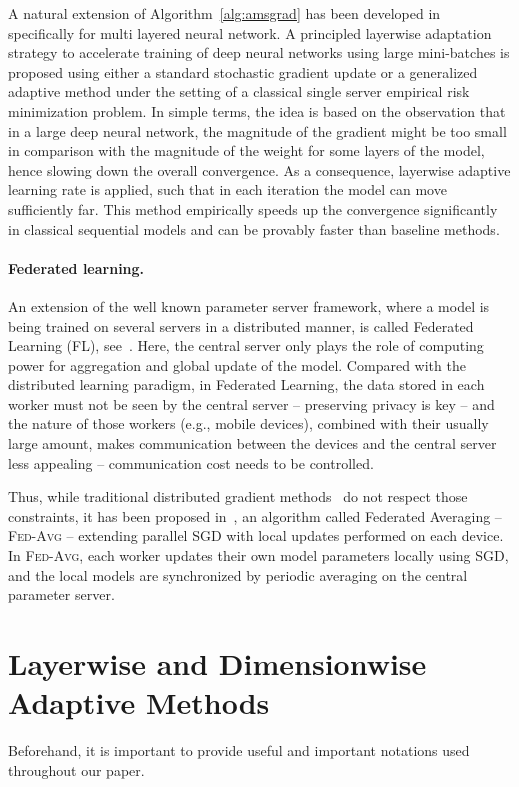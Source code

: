 \documentclass{article}
\begin{document}
A natural extension of Algorithm~\ref{alg:amsgrad} has been developed in~\citet{you2019large} specifically for multi layered neural network. 
A principled layerwise adaptation strategy to accelerate training of deep neural networks using large mini-batches is proposed using either a standard stochastic gradient update or a generalized adaptive method under the setting of a classical single server empirical risk minimization problem. 
 In simple terms, the idea is based on the observation that in a large deep neural network, the magnitude of the gradient might be too small in comparison with the magnitude of the weight for some layers of the model, hence slowing down the overall convergence. 
As a consequence, layerwise adaptive learning rate is applied, such that in each iteration the model can move sufficiently far. 
This method empirically speeds up the convergence significantly in classical sequential models and can be provably faster than baseline methods.


\medskip
\paragraph{Federated learning.}
An extension of the well known parameter server framework, where a model is being trained on several servers in a distributed manner, is called Federated Learning (FL), see~\citet{konevcny2016federated}.
Here, the central server only plays the role of computing power for aggregation and global update of the model.
Compared with the distributed learning paradigm, in Federated Learning, the data stored in each worker must not be seen by the central server -- preserving privacy is key -- and the nature of those workers (e.g., mobile devices), combined with their usually large amount, makes communication between the devices and the central server less appealing -- communication cost needs to be controlled.

Thus, while traditional distributed gradient methods~\citep{recht2011hogwild,li2014scaling,zhao2020distributed} do not respect those constraints, it has been proposed in~\citet{mcmahan2017communication}, an algorithm called Federated Averaging -- \textsc{Fed-Avg} -- extending parallel SGD with local updates performed on each device. 
In \textsc{Fed-Avg}, each worker updates their own model parameters locally using SGD, and the local models are synchronized by periodic averaging on the central parameter server.


\section{Layerwise and Dimensionwise Adaptive Methods}\label{sec:main}
Beforehand, it is important to provide useful and important notations used throughout our paper.
\end{document}
